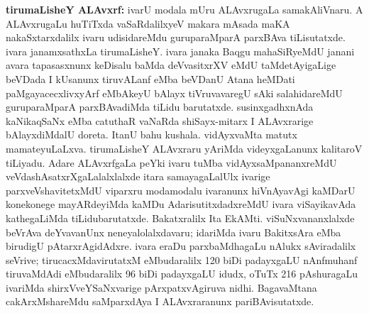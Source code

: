 {\large\textbf{tirumaLisheY ALAvxrf:}} ivarU modala mUru ALAvxrugaLa samakAliVnaru. A ALAvxrugaLu huTiTxda vaSaRdalilxyeV makara mAsada maKA nakaSxtarxdalilx ivaru udisidareMdu guruparaMparA parxBAva tiLisutatxde. ivara janamxsathxLa tirumaLisheY. ivara janaka Baqgu mahaSiRyeMdU janani avara tapasasxnunx keDisalu baMda deVvasitxrXV eMdU taMdetAyigaLige beVDada I kUsanunx tiruvALanf eMba beVDanU Atana heMDati paMgayacecxlivxyArf eMbAkeyU bAlayx tiVruvavaregU sAki salahidareMdU guruparaMparA parxBAvadiMda tiLidu barutatxde. susinxgadhxnAda kaNikaqSaNx eMba catuthaR vaNaRda shiSayx-mitarx I ALAvxrarige bAlayxdiMdalU doreta. ItanU bahu kushala. vidAyxvaMta matutx mamateyuLaLxva. tirumaLisheY ALAvxraru yAriMda videyxgaLanunx kalitaroV tiLiyadu. Adare ALAvxrfgaLa peYki ivaru tuMba vidAyxsaMpananxreMdU veVdashAsatxrXgaLalalxlalxde itara samayagaLalUlx ivarige parxveVshavitetxMdU viparxru modamodalu ivaranunx hiVnAyavAgi kaMDarU konekonege mayARdeyiMda kaMDu AdarisutitxdadxreMdU ivara viSayikavAda kathegaLiMda tiLidubarutatxde. Bakatxralilx Ita EkAMti. viSuNxvananxlalxde beVrAva deYvavanUnx neneyalolalxdavaru; idariMda ivaru BakitxsAra eMba birudigU pAtarxrAgidAdxre. ivara eraDu parxbaMdhagaLu nAlukx sAviradalilx seVrive; tirucacxMdavirutatxM eMbudaralilx {\rm 120} biDi padayxgaLU nAnfmuhanf tiruvaMdAdi eMbudaralilx {\rm 96} biDi padayxgaLU idudx, oTuTx {\rm 216} pAshuragaLu ivariMda shirxVveYSaNxvarige pArxpatxvAgiruva nidhi. BagavaMtana cakArxMshareMdu saMparxdAya I ALAvxraranunx pariBAvisutatxde.

